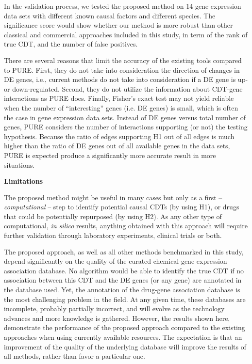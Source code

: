 In the validation process, we tested the proposed method on 14 gene expression data sets with different known causal factors and different species. The significance score would show whether our method is more robust than other classical and commercial approaches included in this study, in term of the rank of true CDT, and the number of false positives.

There are several reasons that limit the accuracy of the existing tools compared to PURE. First, they do not take into consideration the direction of changes in DE genes, i.e., current methods do not take into consideration if a DE gene is up- or down-regulated. Second, they do not utilize the information about CDT-gene interactions as PURE does. Finally, Fisher's exact test may not yield reliable when the number of ``interesting'' genes (i.e. DE genes) is small, which is often the case in gene expression data sets. Instead of DE genes versus total number of  genes, PURE considers the number of interactions supporting (or not)  the testing hypothesis. Because the ratio of edges supporting H1 out of all edges is much higher than the ratio of DE genes out of all available genes in the data sets, PURE is expected produce a significantly more accurate result in more situations.

\textbf{Limitations}


The proposed method might be useful in many cases but only as a first -- \emph{computational} -- step to identify potential  causal CDTs (by using  H1), or drugs that could be potentially repurposed (by using H2). As any other type of computational, \textit{in silico} results, anything obtained with this approach will require further validation through laboratory experiments, clinical trials or both.

The proposed approach, as well as all other methods benchmarked in this study, depend significantly on the quality of the curated chemical-gene expression association database.
No algorithm would be able to identify the true CDT if no association between this CDT and the DE genes (or any gene) are annotated in the database used.
Yet, the annotation of the drug-gene association database is the most challenging problem in the field. 
At any given time, these databases are incomplete, probably partially incorrect, and will evolve as the technology advances and more knowledge is gathered. 
However, the results shown here, demonstrate the performance of the proposed approach 
compared to the existing approaches when using currently available resources. 
The expectation is that an improvement of the quality of the underlying database will improve the results of all methods, rather than favor a particular one. 

